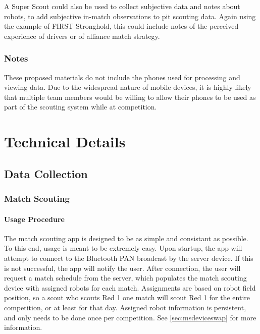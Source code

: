 \documentclass[11pt]{report}
\begin{document}
A Super Scout could also be used to collect subjective data and notes about robots, to add subjective in-match observations to pit scouting data. Again using the example of FIRST Stronghold, this could include notes of the perceived experience of drivers or of alliance match strategy.

\subsection{Notes}

These proposed materials do not include the phones used for processing and viewing data. Due to the widespread nature of mobile devices, it is highly likely that multiple team members would be willing to allow their phones to be used as part of the scouting system while at competition.


\chapter{Technical Details}

\section{Data Collection}
\subsection{Match Scouting}

\subsubsection{Usage Procedure}

The match scouting app is designed to be as simple and consistant as possible. To this end, usage is meant to be extremely easy. Upon startup, the app will attempt to connect to the Bluetooth PAN broadcast by the server device. If this is not successful, the app will notify the user. After connection, the user will request a match schedule from the server, which populates the match scouting device with assigned robots for each match. Assignments are based on robot field position, so a scout who scouts Red 1 one match will scout Red 1 for the entire competition, or at least for that day. Assigned robot information is persistent, and only needs to be done once per competition. See \autoref{sec:msdeviceswap} for more information.
\end{document}
